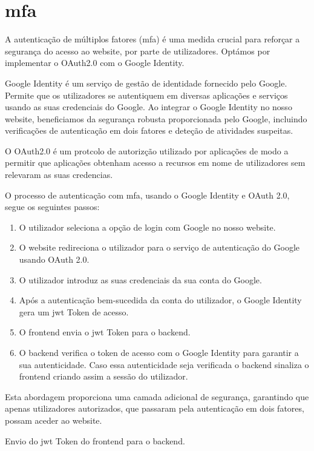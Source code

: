 \section{\ac{mfa}}

A autenticação de múltiplos fatores (\ac{mfa}) é uma medida crucial para reforçar a segurança do acesso ao website, por parte de utilizadores. Optámos por implementar o OAuth2.0 com o Google Identity.

Google Identity é um serviço de gestão de identidade fornecido pelo Google. Permite que os utilizadores se autentiquem em diversas aplicações e serviços usando as suas credenciais do Google. Ao integrar o Google Identity no nosso website, beneficiamos da segurança robusta proporcionada pelo Google, incluindo verificações de autenticação em dois fatores e deteção de atividades suspeitas.

O OAuth2.0 é um protcolo de autorizção utilizado por aplicações de modo a permitir que aplicações obtenham acesso a recursos em nome de utilizadores sem relevaram as suas credencias.

O processo de autenticação com \ac{mfa}, usando o Google Identity e OAuth 2.0, segue os seguintes passos:

\begin{enumerate}
\item O utilizador seleciona a opção de login com Google no nosso website.
\item O website redireciona o utilizador para o serviço de autenticação do Google usando OAuth 2.0.
\item O utilizador introduz as suas credenciais da sua conta do Google.
\item Após a autenticação bem-sucedida da conta do utilizador, o Google Identity gera um \ac{jwt} Token de acesso.
\item O frontend envia o \ac{jwt} Token para o backend. 
\item O backend verifica o token de acesso com o Google Identity para garantir a sua autenticidade. Caso essa autenticidade seja verificada o backend sinaliza o frontend criando assim a sessão do utilizador.
\end{enumerate}

Esta abordagem proporciona uma camada adicional de segurança, garantindo que apenas utilizadores autorizados, que passaram pela autenticação em dois fatores, possam aceder ao website.

Envio do \ac{jwt} Token do frontend para o backend.

